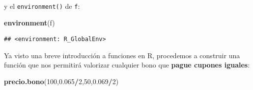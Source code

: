\documentclass[12pt,]{book}
\newenvironment{Shaded}{\begin{snugshade}}{\end{snugshade}}
\newcommand{\KeywordTok}[1]{\textcolor[rgb]{0.13,0.29,0.53}{\textbf{#1}}}
\newcommand{\DecValTok}[1]{\textcolor[rgb]{0.00,0.00,0.81}{#1}}
\newcommand{\FloatTok}[1]{\textcolor[rgb]{0.00,0.00,0.81}{#1}}
\newcommand{\StringTok}[1]{\textcolor[rgb]{0.31,0.60,0.02}{#1}}
\newcommand{\CommentTok}[1]{\textcolor[rgb]{0.56,0.35,0.01}{\textit{#1}}}
\newcommand{\ControlFlowTok}[1]{\textcolor[rgb]{0.13,0.29,0.53}{\textbf{#1}}}
\newcommand{\OperatorTok}[1]{\textcolor[rgb]{0.81,0.36,0.00}{\textbf{#1}}}
\newcommand{\NormalTok}[1]{#1}
\begin{document}
y el \texttt{environment()} de \texttt{f}:

\begin{Shaded}
\begin{Highlighting}[]
\KeywordTok{environment}\NormalTok{(f)}
\end{Highlighting}
\end{Shaded}

\begin{verbatim}
## <environment: R_GlobalEnv>
\end{verbatim}

Ya visto una breve introducción a funciones en R, procedemos a construir
una función que nos permitirá valorizar cualquier bono que \textbf{pague
cupones iguales}:

\begin{Shaded}
\end{Shaded}

\begin{Shaded}
\begin{Highlighting}[]
\KeywordTok{precio.bono}\NormalTok{(}\DecValTok{100}\NormalTok{,}\FloatTok{0.065}\OperatorTok{/}\DecValTok{2}\NormalTok{,}\DecValTok{50}\NormalTok{,}\FloatTok{0.069}\OperatorTok{/}\DecValTok{2}\NormalTok{)}
\end{Highlighting}
\end{Shaded}
\end{document}
